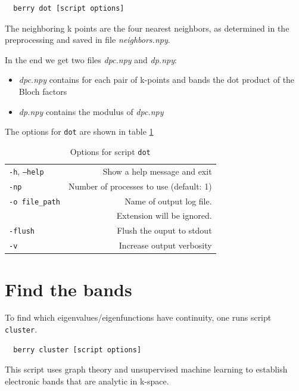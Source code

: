 \documentclass[a4paper,12pt]{report}
\begin{document}
\begin{verbatim}
  berry dot [script options]
\end{verbatim}

The neighboring k points are the four nearest neighbors, as determined in the preprocessing
and saved in file \emph{neighbors.npy}.

In the end we get two files \emph{dpc.npy} and \emph{dp.npy}:
\begin{itemize}
 \item \emph{dpc.npy} contains for each pair of k-points and bands the dot product of the Bloch factors
 \item \emph{dp.npy} contains the modulus of \emph{dpc.npy}
\end{itemize}
The options for \texttt{dot} are shown in table \ref{tab:options_dot}

\begin{table}[h]
 \centering
 \caption{Options for script \texttt{dot}}\label{tab:options_dot}
\begin{tabular}[]{lr}
\hline
  \texttt{-h}, \texttt{--help}  &\hspace*{2cm} Show a help message and exit \\
  \texttt{-np}                  & Number of processes to use (default: 1) \\
  \texttt{-o file\_path}        & Name of output log file.\\
                                & Extension will be ignored. \\
  \texttt{-flush}               & Flush the ouput to stdout \\
  \texttt{-v}                   & Increase output verbosity \\
  \hline
\end{tabular}
\end{table}



\section{Find the bands}
To find which eigenvalues/eigenfunctions have continuity, one runs script \texttt{cluster}.

\begin{verbatim}
  berry cluster [script options]
\end{verbatim}

This script uses graph theory and unsupervised machine learning to establish electronic bands
that are analytic in k-space.
\end{document}
